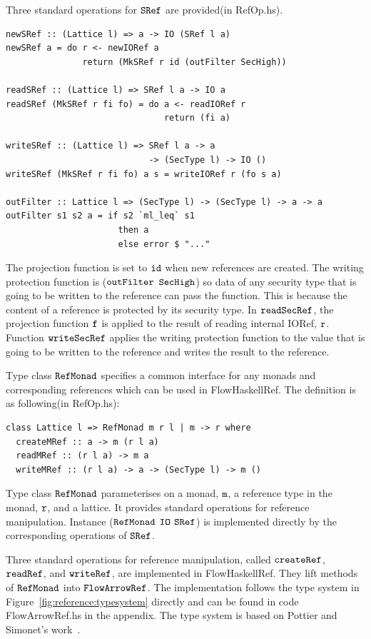 \documentclass{report}
\newcommand{\co}[1]{$\cod{#1}$}
\begin{document}
Three standard operations for \co{SRef} are provided(in RefOp.hs).
\begin{Verbatim}[fontsize=\small]
newSRef :: (Lattice l) => a -> IO (SRef l a)
newSRef a = do r <- newIORef a
               return (MkSRef r id (outFilter SecHigh))

readSRef :: (Lattice l) => SRef l a -> IO a
readSRef (MkSRef r fi fo) = do a <- readIORef r
                               return (fi a)

writeSRef :: (Lattice l) => SRef l a -> a 
                            -> (SecType l) -> IO ()
writeSRef (MkSRef r fi fo) a s = writeIORef r (fo s a)

outFilter :: Lattice l => (SecType l) -> (SecType l) -> a -> a
outFilter s1 s2 a = if s2 `ml_leq` s1
                      then a
                      else error $ "..." 
\end{Verbatim}
The projection function is set to \co{id} when new references are created. The writing
protection function is (\co{outFilter} \co{SecHigh}) so data of any security type that
is going to be written to the reference can pass the function.
This is because the content of a reference is protected by its security type.
In \co{readSecRef},
the projection function \co{f} is applied to the result of reading internal IORef, \co{r}.
Function \co{writeSecRef} applies the writing protection function to the value that is going
to be written to the reference and writes the result to the reference.

Type class \co{RefMonad} specifies a common interface for any monads and corresponding references
which can be used in FlowHaskellRef. The definition is as following(in RefOp.hs):
\begin{Verbatim}[fontsize=\small]
class Lattice l => RefMonad m r l | m -> r where
  createMRef :: a -> m (r l a)
  readMRef :: (r l a) -> m a
  writeMRef :: (r l a) -> a -> (SecType l) -> m ()
\end{Verbatim}
Type class \co{RefMonad} parameterises on a monad, \co{m}, a reference type in the monad, \co{r},
and a lattice.
It provides standard operations for reference manipulation. 
Instance (\co{RefMonad} \co{IO} \co{SRef}) is implemented directly by the corresponding operations of
\co{SRef}.

Three standard operations for reference manipulation, called \co{createRef}, \co{readRef}, 
and \co{writeRef}, are implemented in FlowHaskellRef. They lift methods of \co{RefMonad} into 
\co{FlowArrowRef}. The implementation follows the type system in 
Figure~\ref{fig:reference:typesystem} directly and can be found in code FlowArrowRef.hs in 
the appendix.
The type system is based on Pottier and Simonet's work~\cite{Pottier:Simonet:POPL02}.
\end{document}
